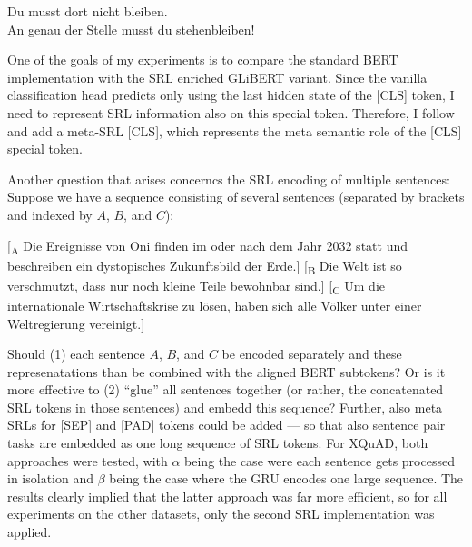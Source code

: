 \begin{examples}
  \item Du musst dort nicht bleiben.\\
        An genau der Stelle musst du stehenbleiben!

                                    
\end{examples}

One of the goals of my experiments is to compare the standard BERT implementation with the SRL
enriched GLiBERT variant. Since the vanilla classification head predicts only using the last
hidden state of the [CLS] token, I need to represent SRL information also on this special
token. Therefore, I follow \cite{zhang2019semantics} and add a meta-SRL [CLS], which represents
the meta semantic role of the [CLS] special token.

Another question that arises concerncs the SRL encoding of multiple sentences:
Suppose we have a sequence consisting of several sentences (separated by brackets and indexed by $A$, $B$, and $C$):

\begin{examples}
  \item {[}\textsubscript{A} Die Ereignisse von Oni finden im oder nach dem Jahr 2032 statt und beschreiben ein dystopisches Zukunftsbild der Erde.] [\textsubscript{B} Die Welt ist so verschmutzt, dass nur noch kleine Teile bewohnbar sind.] [\textsubscript{C} Um die internationale Wirtschaftskrise zu lösen, haben sich alle Völker unter einer Weltregierung vereinigt.]
\end{examples}

Should (1) each sentence $A$, $B$, and $C$ be encoded separately and these represenatations
than be combined with the aligned BERT subtokens? Or is it more effective to (2) ``glue'' all
sentences together (or rather, the concatenated SRL tokens in those sentences) and embedd this
sequence? Further, also meta SRLs for [SEP] and [PAD] tokens could be added --- so that also
sentence pair tasks are embedded as one long sequence of SRL tokens. For XQuAD, both approaches
were tested, with $\alpha$ being the case were each sentence gets processed in isolation and
$\beta$ being the case where the GRU encodes one large sequence. The results clearly implied
that the latter approach was far more efficient, so for all experiments on the other datasets,
only the second SRL implementation was applied.


